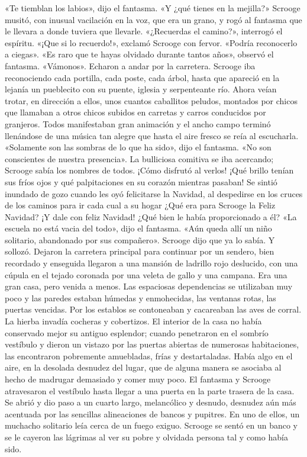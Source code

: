 \documentclass{novela}
\begin{document}
 «Te tiemblan los labios», dijo el fantasma. «Y ¿qué tienes en la mejilla?»
 Scrooge musitó, con inusual vacilación en la voz, que era un grano, y rogó al fantasma que le llevara a donde tuviera que llevarle.
 «¿Recuerdas el camino?», interrogó el espíritu.
 «¡Que si lo recuerdo!», exclamó Scrooge con fervor. «Podría reconocerlo a ciegas».
 «Es raro que te hayas olvidado durante tantos años», observó el fantasma. «Vámonos».
 Echaron a andar por la carretera. Scrooge iba reconociendo cada portilla, cada poste, cada árbol, hasta que apareció en la lejanía un pueblecito con su puente, iglesia y serpenteante río. Ahora veían trotar, en dirección a ellos, unos cuantos caballitos peludos, montados por chicos que llamaban a otros chicos subidos en carretas y carros conducidos por granjeros. Todos manifestaban gran animación y el ancho campo terminó llenándose de una música tan alegre que hasta el aire fresco se reía al escucharla.
 «Solamente son las sombras de lo que ha sido», dijo el fantasma. «No son conscientes de nuestra presencia».
 La bulliciosa comitiva se iba acercando; Scrooge sabía los nombres de todos. ¡Cómo disfrutó al verlos! ¡Qué brillo tenían sus fríos ojos y qué palpitaciones en su corazón mientras pasaban! Se sintió inundado de gozo cuando les oyó felicitarse la Navidad, al despedirse en los cruces de los caminos para ir cada cual a su hogar ¿Qué era para Scrooge la Feliz Navidad? ¡Y dale con feliz Navidad! ¿Qué bien le había proporcionado a él?
 «La escuela no está vacia del todo», dijo el fantasma. «Aún queda allí un niño solitario, abandonado por sus compañero».
 Scrooge dijo que ya lo sabía. Y sollozó.
 Dejaron la carretera principal para continuar por un sendero, bien recordado y enseguida llegaron a una mansión de ladrillo rojo deslucido, con una cúpula en el tejado coronada por una veleta de gallo y una campana. Era una gran casa, pero venida a menos. Las espaciosas dependencias se utilizaban muy poco y las paredes estaban húmedas y enmohecidas, las ventanas rotas, las puertas vencidas. Por los establos se contoneaban y cacareaban las aves de corral. La hierba invadía cocheras y cobertizos. El interior de la casa no había conservado mejor su antiguo esplendor; cuando penetraron en el sombrío vestíbulo y dieron un vistazo por las puertas abiertas de numerosas habitaciones, las encontraron pobremente amuebladas, frías y destartaladas. Había algo en el aire, en la desolada desnudez del lugar, que de alguna manera se asociaba al hecho de madrugar demasiado y comer muy poco.
 El fantasma y Scrooge atravesaron el vestíbulo hasta llegar a una puerta en la parte trasera de la casa. Se abrió y dio paso a un cuarto largo, melancólico y desnudo, desnudez aún más acentuada por las sencillas alineaciones de bancos y pupitres. En uno de ellos, un muchacho solitario leía cerca de un fuego exiguo. Scrooge se sentó en un banco y se le cayeron las lágrimas al ver su pobre y olvidada persona tal y como había sido.
\end{document}
